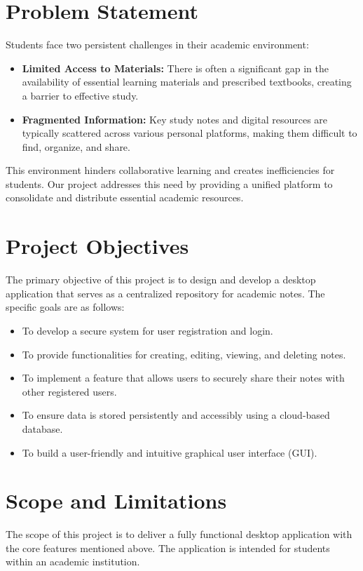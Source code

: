 \documentclass[12pt, a4paper]{report}
\begin{document}
\section{Problem Statement}
Students face two persistent challenges in their academic environment:
\begin{itemize}
    \item \textbf{Limited Access to Materials:} There is often a significant gap in the availability of essential learning materials and prescribed textbooks, creating a barrier to effective study.
    \item \textbf{Fragmented Information:} Key study notes and digital resources are typically scattered across various personal platforms, making them difficult to find, organize, and share.
\end{itemize}
This environment hinders collaborative learning and creates inefficiencies for students. Our project addresses this need by providing a unified platform to consolidate and distribute essential academic resources.

\section{Project Objectives}
The primary objective of this project is to design and develop a desktop application that serves as a centralized repository for academic notes. The specific goals are as follows:
\begin{itemize}
    \item To develop a secure system for user registration and login.
    \item To provide functionalities for creating, editing, viewing, and deleting notes.
    \item To implement a feature that allows users to securely share their notes with other registered users.
    \item To ensure data is stored persistently and accessibly using a cloud-based database.
    \item To build a user-friendly and intuitive graphical user interface (GUI).
\end{itemize}

\section{Scope and Limitations}
The scope of this project is to deliver a fully functional desktop application with the core features mentioned above. The application is intended for students within an academic institution. 
\end{document}
